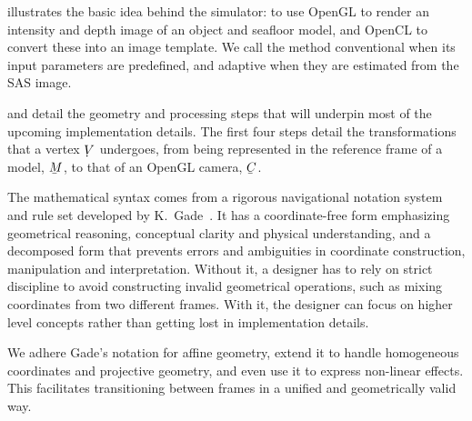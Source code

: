  illustrates the basic idea behind the simulator: to use OpenGL to render an intensity and depth image of an object and seafloor model, and OpenCL to convert these into an image template. We call the method conventional when its input parameters are predefined, and adaptive when they are estimated from the SAS image.



 and  detail the geometry and processing steps that will underpin most of the upcoming implementation details. The first four steps detail the transformations that a vertex $\udot{V}$ undergoes, from being represented in the reference frame of a model, $\ubar{M}$, to that of an OpenGL camera, $\ubar{C}$.



The mathematical syntax comes from a rigorous navigational notation system and rule set developed by K.~Gade~\cite{Gade2018}. It has a coordinate-free form emphasizing geometrical reasoning, conceptual clarity and physical understanding, and a decomposed form that prevents errors and ambiguities in coordinate construction, manipulation and interpretation. Without it, a designer has to rely on strict discipline to avoid constructing invalid geometrical operations, such as mixing coordinates from two different frames. With it, the designer can focus on higher level concepts rather than getting lost in implementation details. 


We adhere Gade's notation for affine geometry, extend it to handle homogeneous coordinates and projective geometry, and even use it to express non-linear effects. This facilitates transitioning between frames in a unified and geometrically valid way.





